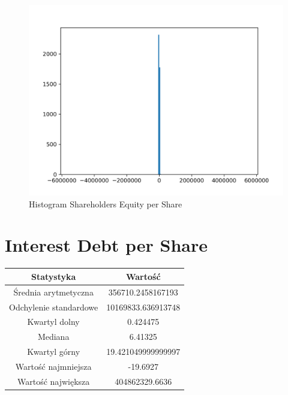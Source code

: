 \documentclass{article}
\begin{document}
\begin{figure}[h!]
    \includegraphics[width=\linewidth]{variables/Shareholders Equity per Share.png}
    \caption{Histogram Shareholders Equity per Share }
\end{figure}\section{ Interest Debt per Share }

\begin{center}
    \begin{tabular}{|c | c|} 
    \hline
    Statystyka & Wartość \\
    \hline\hline
    Średnia arytmetyczna & 356710.2458167193 \\ 
    \hline
    Odchylenie standardowe & 10169833.636913748 \\
    \hline
    Kwartyl dolny & 0.424475 \\
    \hline
    Mediana & 6.41325 \\
    \hline
    Kwartyl górny & 19.421049999999997 \\
    \hline
    Wartość najmniejsza & -19.6927 \\
    \hline
    Wartość największa & 404862329.6636 \\
    \hline
   \end{tabular}
\end{center}
\end{document}

